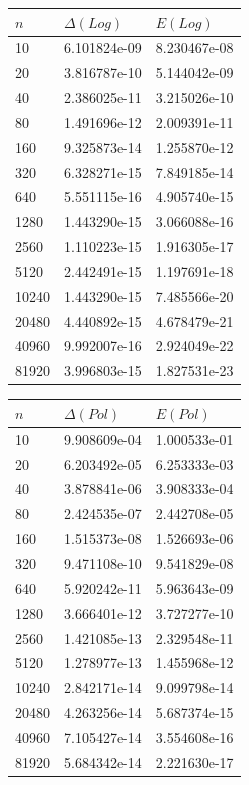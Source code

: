\begin{figure}[H]
 \begin{subtable}[b]{0.5\textwidth}
  \centering\small
\begin{tabular}{lll}
\hline
$n$ & $\Delta(Log)$ & $E(Log)$\\
\hline
10 & 6.101824e-09 & 8.230467e-08\\
20 & 3.816787e-10 & 5.144042e-09\\
40 & 2.386025e-11 & 3.215026e-10\\
80 & 1.491696e-12 & 2.009391e-11\\
160 & 9.325873e-14 & 1.255870e-12\\
320 & 6.328271e-15 & 7.849185e-14\\
640 & 5.551115e-16 & 4.905740e-15\\
1280 & 1.443290e-15 & 3.066088e-16\\
2560 & 1.110223e-15 & 1.916305e-17\\
5120 & 2.442491e-15 & 1.197691e-18\\
10240 & 1.443290e-15 & 7.485566e-20\\
20480 & 4.440892e-15 & 4.678479e-21\\
40960 & 9.992007e-16 & 2.924049e-22\\
81920 & 3.996803e-15 & 1.827531e-23\\
\end{tabular}
 \end{subtable}
 \begin{subtable}[b]{0.5\textwidth}
  \centering\small
\begin{tabular}{lll}
\hline
$n$ & $\Delta(Pol)$ & $E(Pol)$\\
\hline
10 & 9.908609e-04 & 1.000533e-01\\
20 & 6.203492e-05 & 6.253333e-03\\
40 & 3.878841e-06 & 3.908333e-04\\
80 & 2.424535e-07 & 2.442708e-05\\
160 & 1.515373e-08 & 1.526693e-06\\
320 & 9.471108e-10 & 9.541829e-08\\
640 & 5.920242e-11 & 5.963643e-09\\
1280 & 3.666401e-12 & 3.727277e-10\\
2560 & 1.421085e-13 & 2.329548e-11\\
5120 & 1.278977e-13 & 1.455968e-12\\
10240 & 2.842171e-14 & 9.099798e-14\\
20480 & 4.263256e-14 & 5.687374e-15\\
40960 & 7.105427e-14 & 3.554608e-16\\
81920 & 5.684342e-14 & 2.221630e-17\\
\end{tabular}
 \end{subtable}
\end{figure}


